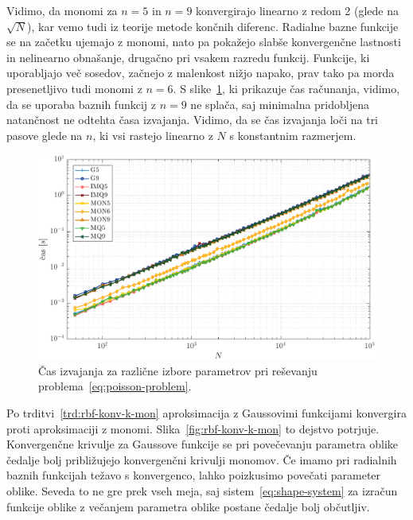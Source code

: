 \documentclass[12pt,a4paper,twoside]{article}
\theoremstyle{definition} %
\theoremstyle{plain} %
\numberwithin{equation}{section}
\newlength{\iw}
\begin{document}
Vidimo, da monomi za $n=5$ in $n=9$ konvergirajo linearno z redom 2 (glede na $\sqrt{N}$), kar vemo
tudi iz teorije metode končnih diferenc. Radialne bazne funkcije se na začetku ujemajo z monomi,
nato pa pokažejo slabše konvergenčne lastnosti in nelinearno obnašanje, drugačno pri vsakem razredu
funkcij. Funkcije, ki uporabljajo več sosedov, začnejo z malenkost nižjo napako, prav tako pa morda
presenetljivo tudi monomi z $n=6$. S slike~\ref{fig:poisson-square-time}, ki prikazuje čas
računanja, vidimo, da se uporaba baznih funkcij z $n = 9$ ne splača, saj minimalna pridobljena
natančnost ne odtehta časa izvajanja. Vidimo, da se čas izvajanja loči na tri pasove glede na $n$,
ki vsi rastejo linearno z $N$ s konstantnim razmerjem.

\begin{figure}[h]
  \centering
  \includegraphics[width=\iw]{images/poisson_square_time.pdf}
  \caption[Čas izvajanja MLSM pri reševanju Poissonove enačbe]{Čas izvajanja za
  različne izbore parametrov pri reševanju
problema~\eqref{eq:poisson-problem}.}
  \label{fig:poisson-square-time}
\end{figure}

Po trditvi~\ref{trd:rbf-konv-k-mon} aproksimacija z Gaussovimi funkcijami konvergira proti
aproksimaciji z monomi. Slika~\ref{fig:rbf-konv-k-mon} to dejstvo potrjuje. Konvergenčne krivulje za
Gaussove funkcije se pri povečevanju parametra oblike čedalje bolj približujejo konvergenčni
krivulji monomov. Če imamo pri radialnih baznih funkcijah težavo s konvergenco, lahko poizkusimo
povečati parameter oblike. Seveda to ne gre prek vseh meja, saj sistem~\eqref{eq:shape-system} za
izračun funkcije oblike z večanjem parametra oblike postane čedalje bolj občutljiv.
\end{document}
